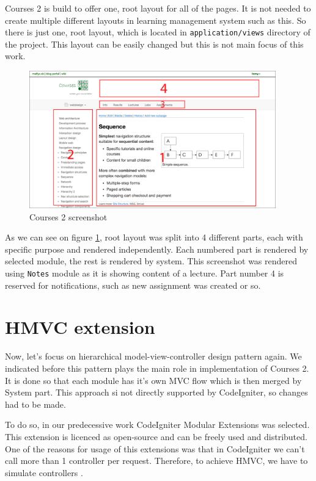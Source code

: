 Courses 2 is build to offer one, root layout for all of the pages. It is not needed to create multiple different layouts in learning management system such as this. So there is just one, root layout, which is located in \texttt{application/views} directory of the project. This layout can be easily changed but this is not main focus of this work.

\begin{figure}[h]
    \centering
    \includegraphics[width=0.95\textwidth]{images/courses-labelled.png}
    \caption{Courses 2 screenshot}
    \label{courses2screen}
\end{figure}


As we can see on figure \ref{courses2screen}, root layout was split into 4 different parts, each with specific purpose and rendered independently. Each numbered part is rendered by selected module, the rest is rendered by system. This screenshot was rendered using \texttt{Notes} module as it is showing content of a lecture. Part number 4 is reserved for notifications, such as new assignment was created or so.

\section{HMVC extension}

Now, let's focus on hierarchical model-view-controller design pattern again. We indicated before this pattern plays the main role in implementation of Courses 2. It is done so that each module has it's own MVC flow which is then merged by System part. This approach si not directly supported by CodeIgniter, so changes had to be made.


To do so, in our predecessive work CodeIgniter Modular Extensions \cite{modularextensions} was selected. This extension is licenced as open-source and can be freely used and distributed. One of the reasons for usage of this extensions was that in CodeIgniter we can’t call more than 1 controller per request. Therefore, to achieve HMVC, we have to simulate controllers \cite{modularextensions}. 


